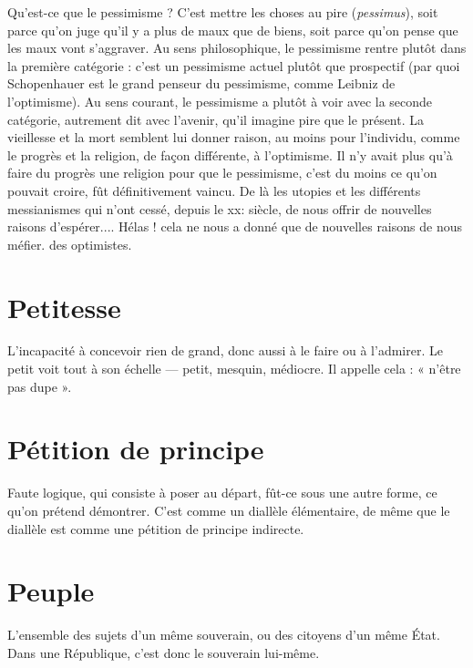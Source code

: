 Qu'est-ce que le pessimisme ? C’est mettre les choses au pire ({\it pessimus}), soit
parce qu’on juge qu’il y a plus de maux que de biens, soit parce qu'on pense
que les maux vont s’aggraver. Au sens philosophique, le pessimisme rentre
plutôt dans la première catégorie : c’est un pessimisme actuel plutôt que prospectif
(par quoi Schopenhauer est le grand penseur du pessimisme, comme
Leibniz de l’optimisme). Au sens courant, le pessimisme a plutôt à voir avec la
seconde catégorie, autrement dit avec l’avenir, qu’il imagine pire que le présent.
La vieillesse et la mort semblent lui donner raison, au moins pour l'individu,
comme le progrès et la religion, de façon différente, à l’optimisme. Il n’y avait
plus qu’à faire du progrès une religion pour que le pessimisme, c’est du moins
ce qu'on pouvait croire, fût définitivement vaincu. De là les utopies et les différents
messianismes qui n’ont cessé, depuis le xx: siècle, de nous offrir de
nouvelles raisons d’espérer.... Hélas ! cela ne nous a donné que de nouvelles raisons
de nous méfier. des optimistes.

\section{Petitesse}
L’incapacité à concevoir rien de grand, donc aussi à le faire ou
à l’admirer. Le petit voit tout à son échelle — petit, mesquin,
médiocre. Il appelle cela : « n’être pas dupe ».

\section{Pétition de principe}
Faute logique, qui consiste à poser au départ,
fût-ce sous une autre forme, ce qu’on prétend
démontrer. C’est comme un diallèle élémentaire, de même que le diallèle est
comme une pétition de principe indirecte.

\section{Peuple}
L'ensemble des sujets d’un même souverain, ou des citoyens d’un
même État. Dans une République, c’est donc le souverain lui-même.

